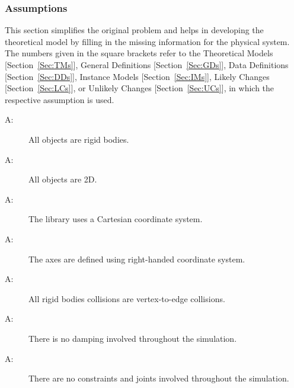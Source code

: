 \documentclass[12pt]{article}
\newcounter{assumpnum}
\newcommand{\atheassumpnum}{A\theassumpnum}
\begin{document}
\subsubsection{Assumptions}
\label{Sec:Assumps}
This section simplifies the original problem and helps in developing the theoretical model by filling in the missing information for the physical system. The numbers given in the square brackets refer to the Theoretical Models {[}Section~\ref{Sec:TMs}{]}, General Definitions {[}Section~\ref{Sec:GDs}{]}, Data Definitions {[}Section~\ref{Sec:DDs}{]}, Instance Models {[}Section~\ref{Sec:IMs}{]}, Likely Changes {[}Section~\ref{Sec:LCs}{]}, or Unlikely Changes {[}Section~\ref{Sec:UCs}{]}, in which the respective assumption is used.
\begin{description}
\item[\atheassumpnum\label{A:objectTy}:]All objects are rigid bodies.
\end{description}
\begin{description}
\item[\atheassumpnum\label{A:objectDimension}:]All objects are 2D.
\end{description}
\begin{description}
\item[\atheassumpnum\label{A:coordinateSystemTy}:]The library uses a Cartesian coordinate system.
\end{description}
\begin{description}
\item[\atheassumpnum\label{A:axesDefined}:]The axes are defined using right-handed coordinate system.
\end{description}
\begin{description}
\item[\atheassumpnum\label{A:collisionType}:]All rigid bodies collisions are vertex-to-edge collisions.
\end{description}
\begin{description}
\item[\atheassumpnum\label{A:dampingInvolvement}:]There is no damping involved throughout the simulation.
\end{description}
\begin{description}
\item[\atheassumpnum\label{A:constraintsAndJointsInvolvement}:]There are no constraints and joints involved throughout the simulation.
\end{description}
\end{document}
